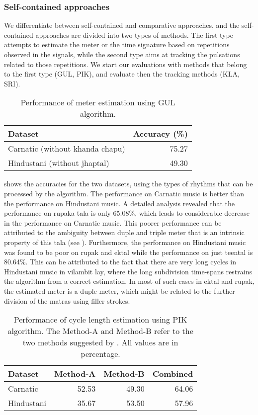\subsubsection{Self-contained approaches}
We differentiate between self-contained and comparative approaches, and the self-contained approaches are divided into two types of methods. The first type attempts to estimate the meter or the time signature based on repetitions observed in the signals, while the second type aims at tracking the pulsations related to those repetitions. We start our evaluations with methods that belong to the first type (\acrshort{GUL}, \acrshort{PIK}), and evaluate then the tracking methods (\acrshort{KLA}, \acrshort{SRI}). 
\begin{table}
\centering
\begin{tabular}{@{}lr@{}}\toprule
Dataset & Accuracy (\%)  					    \tabularnewline \midrule
Carnatic (without \gls{khanda chapu}) & 75.27  \tabularnewline
Hindustani (without \gls{jhaptal}) & 49.30  	\tabularnewline \bottomrule
\end{tabular}
\caption{Performance of meter estimation using \protect\acrshort{GUL} algorithm.}\label{tab:jnmreval:cycleGUL} 
\end{table} 

 shows the accuracies for the two datasets, using the types of rhythms that can be processed by the algorithm. The performance on Carnatic music is better than the performance on Hindustani music. A detailed analysis revealed that the performance on \gls{rupaka} \gls{tala} is only 65.08\%, which leads to considerable decrease in the performance on Carnatic music. This poorer performance can be attributed to the ambiguity between duple and triple meter that is an intrinsic property of this \gls{tala} (see ). Furthermore, the performance on Hindustani music was found to be poor on \gls{rupak} and \gls{ektal} while the performance on just \gls{teental} is 80.64\%. This can be attributed to the fact that there are very long cycles in Hindustani music in \gls{vilambit} \gls{lay}, where the long subdivision time-spans restrains the algorithm from a correct estimation. In most of such cases in \gls{ektal} and \gls{rupak}, the estimated meter is a duple meter, which might be related to the further division of the \glspl{matra} using filler strokes. 
\begin{table}
\centering
\begin{tabular}{@{}lrrr@{}}\toprule
Dataset & Method-A & Method-B & Combined\tabularnewline \midrule
Carnatic & 52.53 & 49.30 & 64.06	\tabularnewline
Hindustani & 35.67 & 53.50 & 57.96	\tabularnewline \bottomrule
\end{tabular}
\caption[Performance of cycle length estimation using \protect\acrshort{PIK} algorithm]{Performance of cycle length estimation using \protect\acrshort{PIK} algorithm. The Method-A and Method-B refer to the two methods suggested by \protect{}. All values are in percentage.}\label{tab:jnmreval:cyclePIK} 
\end{table}

